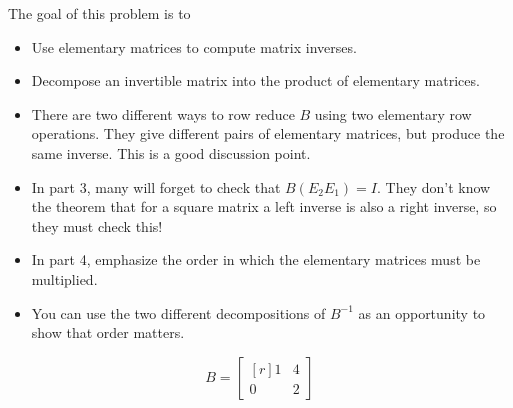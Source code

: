 \documentclass{problemset}
\newcommand{\mat}[1]{\begin{bmatrix*}[r]#1\end{bmatrix*}}
\begin{document}
	\question
	\begin{annotation}
		\begin{goals}

			The goal of this problem is to
			\begin{itemize}
				\item Use elementary matrices to compute matrix inverses.
				\item Decompose an invertible matrix into the product of elementary matrices.
			\end{itemize}
		\end{goals}

		\begin{notes}
			\begin{itemize}
				\item There are two different ways to row reduce $B$ using two elementary row
					operations. They give different pairs of elementary matrices, but produce
					the same inverse. This is a good discussion point.
				\item In part 3, many will forget to check that $B(E_2E_1)=I$. They don't know
					the theorem that for a square matrix a left inverse is also a right inverse,
					so they must check this!
				\item In part 4, emphasize the order in which the elementary matrices must be multiplied.
				\item You can use the two different decompositions of $B^{-1}$ as an opportunity to
					show that order matters.
			\end{itemize}
		\end{notes}
	\end{annotation}
	\[
		B=\mat{1 &4\\0 &2}
	\]
\end{document}
